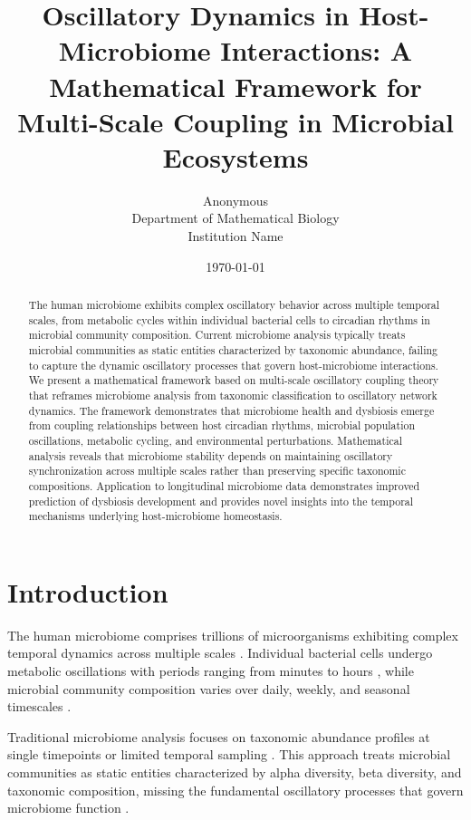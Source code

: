 \documentclass[twocolumn]{article}
\title{Oscillatory Dynamics in Host-Microbiome Interactions: A Mathematical Framework for Multi-Scale Coupling in Microbial Ecosystems}
\author{
Anonymous\\
Department of Mathematical Biology\\
Institution Name
}
\date{\today}
\begin{document}
\maketitle

\begin{abstract}
The human microbiome exhibits complex oscillatory behavior across multiple temporal scales, from metabolic cycles within individual bacterial cells to circadian rhythms in microbial community composition. Current microbiome analysis typically treats microbial communities as static entities characterized by taxonomic abundance, failing to capture the dynamic oscillatory processes that govern host-microbiome interactions. We present a mathematical framework based on multi-scale oscillatory coupling theory that reframes microbiome analysis from taxonomic classification to oscillatory network dynamics. The framework demonstrates that microbiome health and dysbiosis emerge from coupling relationships between host circadian rhythms, microbial population oscillations, metabolic cycling, and environmental perturbations. Mathematical analysis reveals that microbiome stability depends on maintaining oscillatory synchronization across multiple scales rather than preserving specific taxonomic compositions. Application to longitudinal microbiome data demonstrates improved prediction of dysbiosis development and provides novel insights into the temporal mechanisms underlying host-microbiome homeostasis.
\end{abstract}

\section{Introduction}

The human microbiome comprises trillions of microorganisms exhibiting complex temporal dynamics across multiple scales \citep{turnbaugh2007human,qin2010human}. Individual bacterial cells undergo metabolic oscillations with periods ranging from minutes to hours \citep{murray2007temporal}, while microbial community composition varies over daily, weekly, and seasonal timescales \citep{david2014diet,thaiss2014transkingdom}.

Traditional microbiome analysis focuses on taxonomic abundance profiles at single timepoints or limited temporal sampling \citep{caporaso2011qiime,callahan2016dada2}. This approach treats microbial communities as static entities characterized by alpha diversity, beta diversity, and taxonomic composition, missing the fundamental oscillatory processes that govern microbiome function \citep{knight2018best}.
\end{document}
